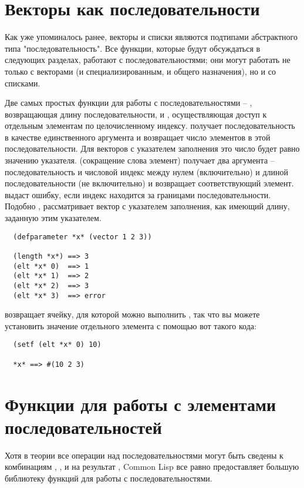 \section{Векторы как последовательности}

Как уже упоминалось ранее, векторы и списки являются подтипами абстрактного типа
"последовательность".  Все функции, которые будут обсуждаться в следующих разделах,
работают с последовательностями; они могут работать не только с векторами (и
специализированным, и общего назначения), но и со списками.

Две самых простых функции для работы с последовательностями -- ,
возвращающая длину последовательности, и , осуществляющая доступ к
отдельным элементам по целочисленному индексу.   получает
последовательность в качестве единственного аргумента и возвращает число элементов в этой
последовательности.  Для векторов с указателем заполнения это число будет равно значению
указателя.  (сокращение слова элемент) получает два аргумента --
последовательность и числовой индекс между нулем (включительно) и длиной
последовательности (не включительно) и возвращает соответствующий элемент.   выдаст ошибку,
если индекс находится за границами последовательности.  Подобно , 
рассматривает вектор с указателем заполнения, как имеющий длину, заданную этим
указателем.

\begin{verbatim}
  (defparameter *x* (vector 1 2 3))
  
  (length *x*) ==> 3
  (elt *x* 0)  ==> 1
  (elt *x* 1)  ==> 2
  (elt *x* 2)  ==> 3
  (elt *x* 3)  ==> error
\end{verbatim}

 возвращает ячейку, для которой можно выполнить , так что вы можете
установить значение отдельного элемента с помощью вот такого кода:

\begin{verbatim}
  (setf (elt *x* 0) 10)
  
  *x* ==> #(10 2 3)
\end{verbatim}

\section{Функции для работы с элементами последовательностей}

Хотя в теории все операции над последовательностями могут быть сведены к комбинациям
, , и  на результат , Common Lisp все равно
предоставляет большую библиотеку функций для работы с последовательностями.

